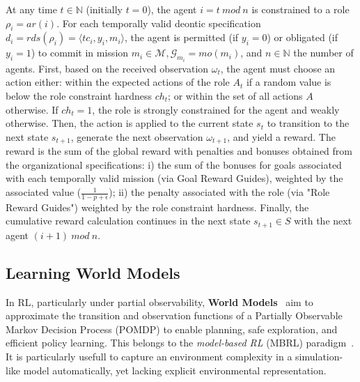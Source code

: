 \documentclass[pdflatex,sn-mathphys-num]{sn-jnl}%
\theoremstyle{thmstyleone}%
\theoremstyle{thmstyletwo}%
\theoremstyle{thmstylethree}%
\begin{document}
At any time $t \in \mathbb{N}$ (initially $t = 0$), the agent $i = t \ mod \ n$ is constrained to a role $\rho_i = ar(i)$. For each temporally valid deontic specification $d_i = rds(\rho_i) = \langle tc_i,y_i, m_i \rangle$, the agent is permitted (if $y_i = 0$) or obligated (if $y_i = 1$) to commit in mission $m_i \in \mathcal{M}, \mathcal{G}_{m_i} = mo(m_i)$, and $n \in \mathbb{N}$ the number of agents.
%
First, based on the received observation $\omega_t$, the agent must choose an action either: within the expected actions of the role $A_t$ if a random value is below the role constraint hardness $ch_t$; or within the set of all actions $A$ otherwise. If $ch_t = 1$, the role is strongly constrained for the agent and weakly otherwise.
%
Then, the action is applied to the current state $s_t$ to transition to the next state $s_{t+1}$, generate the next observation $\omega_{t+1}$, and yield a reward. The reward is the sum of the global reward with penalties and bonuses obtained from the organizational specifications: \quad i) the sum of the bonuses for goals associated with each temporally valid mission (via Goal Reward Guides), weighted by the associated value ($\frac{1}{1-p+\epsilon}$); \quad ii) the penalty associated with the role (via "Role Reward Guides") weighted by the role constraint hardness.
%
Finally, the cumulative reward calculation continues in the next state $s_{t+1} \in S$ with the next agent $(i+1) \ mod \ n$.



\subsection{Learning World Models}

In RL, particularly under partial observability, \textbf{World Models}~\cite{ha2018recurrent} aim to approximate the transition and observation functions of a Partially Observable Markov Decision Process (POMDP) to enable planning, safe exploration, and efficient policy learning. This belongs to the \textit{model-based RL} (MBRL) paradigm~\cite{moerland2020model}. It is particularly usefull to capture an environment complexity in a simulation-like model automatically, yet lacking explicit environmental representation.
\end{document}
